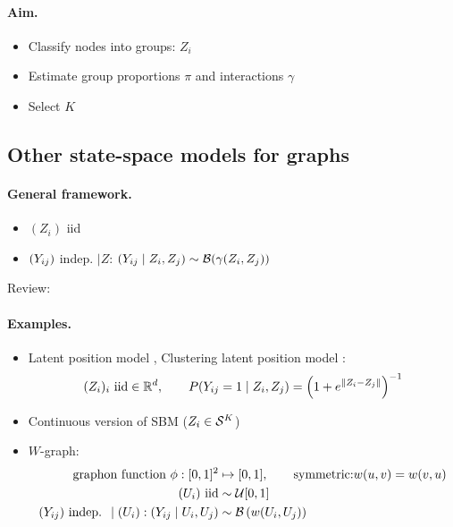 \jump \paragraph{Aim.} 
\begin{itemize}
\item Classify nodes into groups: $Z_i$
\item Estimate group proportions $\pi$ and interactions $\gamma$
\item Select $K$
\end{itemize}


\blank
\subsection{Other state-space models for graphs}

\jump \paragraph{General framework.}
\begin{itemize}
\item $(Z_i)$ iid
\item $({Y_{ij}})$ indep. $\mid Z$: $({Y_{ij}} \mid Z_i, Z_j) \sim \mathcal{B}(\gamma(Z_i, Z_j))$
\end{itemize}
Review: \citep{MaR14}

\jump \paragraph{Examples.}
\begin{itemize}
  \item Latent position model \citep{HRH02}, Clustering latent position model \citep{HRT07}:
  $$
  (Z_i)_i \text{ iid} \in \mathbb{R}^d, \qquad
  P({Y_{ij}} = 1 \mid Z_i, Z_j) = \left(1 + e^{\|Z_i - Z_j\|}\right)^{-1}
  $$
  \item Continuous version of SBM \citep{DPV10} ($Z_i \in \mathcal{S}^K$)
  \item $W$-graph: \citep{LoS06}
  \begin{align*}
    \text{graphon function } \phi: [0, 1]^2 & \mapsto [0, 1], \qquad \text{symmetric:} w(u, v) = w(v, u) \\
    (U_i) \text{ iid} &\sim \mathcal{U}[0, 1] \\
    ({Y_{ij}}) \text{ indep. } \mid (U_i): ({Y_{ij}} \mid U_i, U_j) & \sim \mathcal{B}\left(w(U_i, U_j)\right)
  \end{align*}  
\end{itemize}


